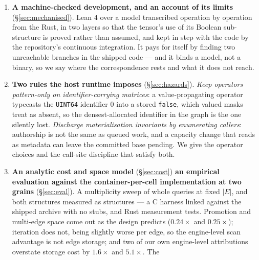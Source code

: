 \documentclass[11pt,a4paper]{article}
\theoremstyle{plain}
\theoremstyle{definition}
\theoremstyle{remark}
\begin{document}
\begin{enumerate}
        (\S\ref{sec:correctness}). We prove
        $|E| = |m| + |dp| - |dm| - |dp \cap m| - \textit{multi} + |me|$
        (Theorem~\ref{thm:count}) --- computable from GraphBLAS metadata plus a
        single structural intersection, with no scan --- and that the
        three-way sorted merge emits each effective edge exactly once in
        lexicographic order without materialising an intermediate matrix
        (Theorem~\ref{thm:iter}).
  \item \textbf{A machine-checked development, and an account of its limits}
        (\S\ref{sec:mechanised}). Lean 4 over a model transcribed operation by
        operation from the Rust, in two layers so that the tensor's use of its
        Boolean sub-structure is proved rather than assumed, and kept in step
        with the code by the repository's continuous integration. It pays for
        itself by finding two unreachable branches in the shipped code --- and
        it binds a model, not a binary, so we say where the correspondence rests
        and what it does not reach.
  \item \textbf{Two rules the host runtime imposes}
        (\S\ref{sec:hazards}). \emph{Keep operators pattern-only on
        identifier-carrying matrices}: a value-propagating operator typecasts
        the \texttt{UINT64} identifier $0$ into a stored \texttt{false},
        which valued masks treat as absent, so the densest-allocated
        identifier in the graph is the one silently lost. \emph{Discharge
        materialisation invariants by enumerating callers}: authorship is not
        the same as queued work, and a capacity change that reads as metadata
        can leave the committed base pending. We give the operator choices and
        the call-site discipline that satisfy both.
  \item \textbf{An analytic cost and space model} (\S\ref{sec:cost})
        \textbf{an empirical evaluation against the container-per-cell
        implementation at two grains} (\S\ref{sec:eval}). A multiplicity sweep
        of whole queries at fixed $|E|$, and both structures measured as
        structures --- a C harness linked against the shipped archive with no
        stubs, and Rust measurement tests. Promotion and multi-edge space come
        out as the design predicts ($0.24\times$ and $0.25\times$); iteration
        does not, being slightly worse per edge, so the engine-level scan
        advantage is not edge storage; and two of our own engine-level
        attributions overstate storage cost by $1.6\times$ and $5.1\times$. The

\end{enumerate}
\end{document}
